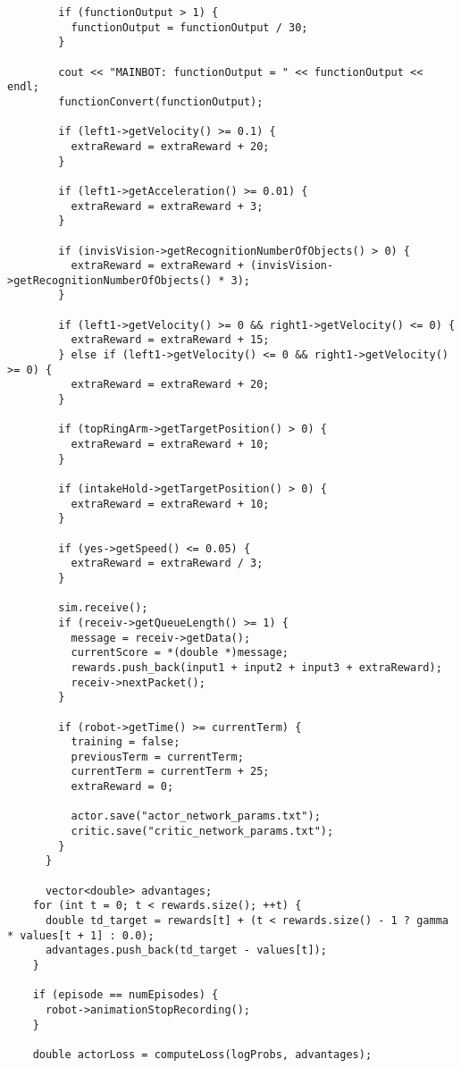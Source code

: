 \begin{verbatim}
        if (functionOutput > 1) {
          functionOutput = functionOutput / 30;
        }
 
        cout << "MAINBOT: functionOutput = " << functionOutput << endl;
        functionConvert(functionOutput);
 
        if (left1->getVelocity() >= 0.1) {
          extraReward = extraReward + 20;
        }
 
        if (left1->getAcceleration() >= 0.01) {
          extraReward = extraReward + 3;
        }
 
        if (invisVision->getRecognitionNumberOfObjects() > 0) {
          extraReward = extraReward + (invisVision->getRecognitionNumberOfObjects() * 3);
        }
 
        if (left1->getVelocity() >= 0 && right1->getVelocity() <= 0) {
          extraReward = extraReward + 15;
        } else if (left1->getVelocity() <= 0 && right1->getVelocity() >= 0) {
          extraReward = extraReward + 20;
        }
 
        if (topRingArm->getTargetPosition() > 0) {
          extraReward = extraReward + 10;
        }
 
        if (intakeHold->getTargetPosition() > 0) {
          extraReward = extraReward + 10;
        }
 
        if (yes->getSpeed() <= 0.05) {
          extraReward = extraReward / 3;
        }
 
        sim.receive();
        if (receiv->getQueueLength() >= 1) {
          message = receiv->getData();
          currentScore = *(double *)message;
          rewards.push_back(input1 + input2 + input3 + extraReward);
          receiv->nextPacket();
        }
 
        if (robot->getTime() >= currentTerm) {
          training = false;
          previousTerm = currentTerm;
          currentTerm = currentTerm + 25;
          extraReward = 0;
 
          actor.save("actor_network_params.txt");
          critic.save("critic_network_params.txt");
        }
      }
 
      vector<double> advantages;
    for (int t = 0; t < rewards.size(); ++t) {
      double td_target = rewards[t] + (t < rewards.size() - 1 ? gamma * values[t + 1] : 0.0);
      advantages.push_back(td_target - values[t]);
    }
 
    if (episode == numEpisodes) {
      robot->animationStopRecording();
    }
 
    double actorLoss = computeLoss(logProbs, advantages);
 

\end{verbatim}
